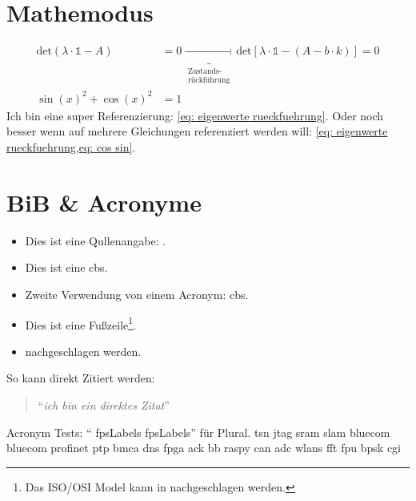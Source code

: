 \documentclass[./\jobname.tex]{subfiles}
\begin{document}
%
\blindmathtrue
\blinddocument
%
\chapter{Mathemodus}
%
\begin{align}
\text{det}(\lambda \cdot \mathds{1} -A) &= 0 \underbrace{\longrightarrow}_{\substack{\text{Zustands-} \\ \text{rückführung}}} \text{det}\left[\lambda\cdot \mathds{1} - \left(A-b\cdot k\right)\right]=0\label{eq: eigenwerte rueckfuehrung}\\
\sin(x)^{2} + \cos(x)^{2} &= 1\label{eq: cos sin}
\end{align}
%
Ich bin eine super Referenzierung: \cref{eq: eigenwerte rueckfuehrung}. Oder noch besser wenn auf mehrere Gleichungen referenziert werden will: \cref{eq: eigenwerte rueckfuehrung,eq: cos sin}.
%
\chapter{BiB \& Acronyme}
%
\begin{itemize}
	\item Dies ist eine Qullenangabe: \parencite[Vgl.][S.220-224]{IEEE802.1Q2014}.
	\item Dies ist eine \gls{cbs}.
	\item Zweite Verwendung von einem Acronym: \gls{cbs}.
	\item Dies ist eine Fußzeile\footnote{Das ISO/OSI Model kann in \cite[][S.2-9]{Mandl2010} nachgeschlagen werden.}.
	\item \textcite[][S.2-9]{Mandl2010} nachgeschlagen werden.
\end{itemize}
%
So kann direkt Zitiert werden:
%
\begin{quote}
	\enquote{\textit{ich bin ein direktes Zitat}} \cite{Broster2001}
\end{quote}
%
Acronym Tests: \enquote{ \glspl{fpsLabel} \glspl{fpsLabel}} für Plural.
%
\newpage
%
\gls{tsn} \gls{jtag} \gls{sram} \gls{slam} \gls{bluecom} \gls{bluecom} \gls{profinet} \gls{ptp} \gls{bmca} \gls{dns} \gls{fpga} \gls{ack} \gls{bb} \gls{raspy} \gls{can} \gls{adc} \glspl{wlan} \gls{fft} \gls{fpu} \gls{bpsk} \gls{cgi}\par
%
\blindtext[1]
%
\end{document}
